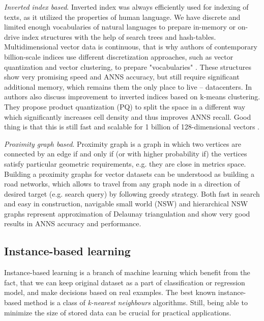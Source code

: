 \emph{Inverted index based}. Inverted index was always efficiently used for indexing of texts, as it utilized the properties of human language. We have discrete and limited enough vocabularies of natural languages to prepare in-memory or on-drive index structures with the help of search trees and hash-tables. Multidimensional vector data is continuous, that is why authors of contemporary billion-scale indices use different discretization approaches, such as vector quantization and vector clustering, to prepare "vocabularies" \cite{InvertedMultiIndex}\cite{RevisitedInvertedIndex}. These structures show very promising speed and ANNS accuracy, but still require significant additional memory, which remains them the only place to live -- datacenters. In \cite{InvertedMultiIndex} authors also discuss improvement to inverted indices based on k-means clustering. They propose product quantization (PQ) to split the space in a different way which significantly increases cell density and thus improves ANNS recall. Good thing is that this is still fast and scalable for 1 billion of 128-dimensional vectors \cite{bigann}.

\emph{Proximity graph based}. Proximity graph is a graph in which two vertices are connected by an edge if and only if (or with higher probability if) the vertices satisfy particular geometric requirements, e.g. they are close in metrics space.
Building a proximity graphs for vector datasets can be understood as building a road networks, which allows to travel from any graph node in a direction of desired target (e.g. search query) by following greedy strategy.
Both fast in search and easy in construction, navigable small world (NSW) and hierarchical NSW \cite{hnsw} graphs represent approximation of Delaunay triangulation and show very good results in ANNS accuracy and performance.

\subsection{Instance-based learning}

Instance-based learning is a branch of machine learning which benefit from the fact, that we can keep original dataset as a part of classification or regression model, and make decisions based on real examples. The best known instance-based method is a class of \emph{k-nearest neighbours} algorithms. Still, being able to minimize the size of stored data can be crucial for practical applications. 

